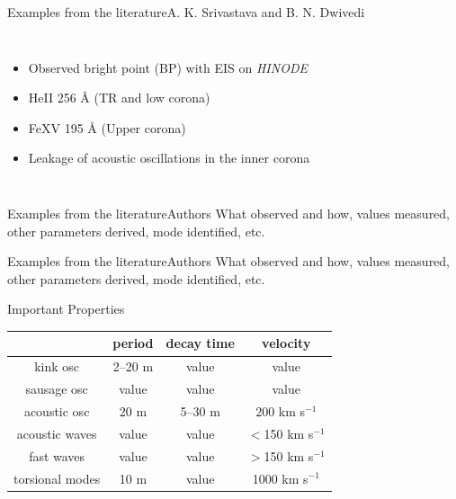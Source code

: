 \documentclass[table]{beamer}
\begin{document}
\begin{frame}{Examples from the literature}{A. K. Srivastava and B. N. Dwivedi}
\begin{columns}
\begin{itemize}
            \item Observed bright point (BP) with EIS on \emph{HINODE}
            \item He{\footnotesize II} 256 \AA{} (TR and low corona)
            \item Fe{\footnotesize XV} 195 \AA{} (Upper corona)
            \item Leakage of acoustic oscillations in the inner corona
        \end{itemize}
    \end{columns}
\end{frame}%
\begin{frame}{Examples from the literature}{Authors}
    What observed and how, values measured, other parameters derived,
    mode identified, etc.
\end{frame}%
\begin{frame}{Examples from the literature}{Authors}
    What observed and how, values measured, other parameters derived,
    mode identified, etc.
\end{frame}%
\begin{frame}{Important Properties}
\begin{center}
    \begin{tabular}{c|c|c|c|}
    \cline{2-4} & {\textbf{period}} &
        {\textbf{decay time}} &
        {\textbf{velocity}}\\
    \hline \multicolumn{0}{|c|}{kink osc} &
        2--20 m & value & value\\
    \hline \multicolumn{0}{|c|}{sausage osc} &
        value & value & value\\
    \hline \multicolumn{0}{|c|}{acoustic osc} &
        20 m & 5--30 m & 200 km s$^{-1}$\\
    \hline \multicolumn{0}{|c|}{acoustic waves} &
        value & value & $<$150 km s$^{-1}$\\
    \hline \multicolumn{0}{|c|}{fast waves} &
        value & value & $>$150 km s$^{-1}$\\
    \hline \multicolumn{0}{|c|}{torsional modes} &
        10 m & value & 1000 km s$^{-1}$\\
    \hline
    \end{tabular}
\end{center}
\end{frame}%
\end{document}
